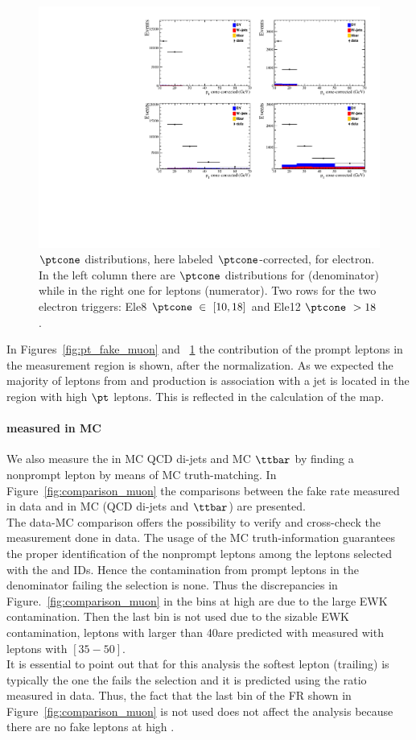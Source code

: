 \begin{figure}[h!]
\centering
\includegraphics[width=.7\textwidth]{Figures/c5/FAKE/pt_cone_ele.pdf}
\caption{$\ptcone$ distributions, here labeled $\ptcone$-corrected,
  for electron. In the left column there are $\ptcone$ distributions
  for \fo  (denominator) while in the
  right one for \ti  leptons (numerator). Two
  rows for the two electron triggers: Ele8 $\ptcone \ \in \ [10,18]$\GeV
  and Ele12 $\ptcone \ > 18$\GeV.}
\label{fig:pt_fake_ele}
\end{figure}

In Figures~\ref{fig:pt_fake_muon} and ~\ref{fig:pt_fake_ele} 
the contribution of the prompt leptons in the measurement region is shown, after
the normalization. As we expected the majority of leptons from \PW and
\PZ production is association with a jet is located in the region with
high $\pt$ leptons. This is
reflected in the calculation of the \fr map.

\paragraph{\fr measured in MC}
We also measure the \fr in MC QCD di-jets and MC $\ttbar$ by
finding a nonprompt lepton by means of MC truth-matching. In
Figure~\ref{fig:comparison_muon} the comparisons between the fake rate
measured in data and in MC (QCD di-jets and $\ttbar$)  are
presented.\\
The data-MC comparison offers the possibility to verify and cross-check the
measurement done in data. The usage of the MC truth-information
guarantees the proper identification of the nonprompt leptons among
the leptons selected with the \fo and \ti  IDs. Hence the contamination
from prompt leptons in the denominator failing the \ti  selection is
none. Thus the discrepancies in Figure.~\ref{fig:comparison_muon} in the
bins at high \pt are due to the large EWK contamination. Then the last
bin is not used due to the sizable EWK contamination, leptons with \pt
larger than 40\GeV are predicted with \fr measured with leptons
with \pt $[35-50]$\GeV.\\
It is essential to point out that for this analysis the softest lepton (trailing) is typically the one the fails the \ti  selection and it is predicted using the \fr ratio measured in data. Thus, the fact that the last bin of the FR shown in Figure~\ref{fig:comparison_muon} is not used does not affect the analysis because there are no fake leptons at high \pt. 


